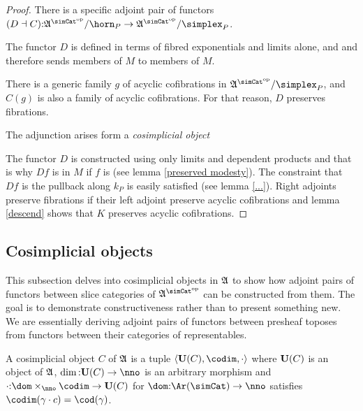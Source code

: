 \documentclass[csh.tex]{subfiles}
\begin{document}
\newcommand\dsum[1]{\Sigma_{#1}}
\begin{proof}









There is a specific adjoint pair of functors $(D\dashv C)\of\ambient\s/\horn_P\to\ambient\s/\simplex_P$.


The functor $D$ is defined in terms of fibred exponentials and limits alone, and and therefore sends members of $M$ to members of $M$. 



There is a generic family $g$ of acyclic cofibrations in $\ambient\s/\simplex_P$, and $C(g)$ is also a family of acyclic cofibrations. For that reason, $D$ preserves fibrations.






The adjunction arises form a \emph{cosimplicial object} %

The functor $D$ is constructed using only limits and dependent products and that is why $Df$ is in $M$ if $f$ is (see lemma \ref{preserved modesty}).
The constraint that $Df$ is the pullback along $k_P$ is easily satisfied (see lemma \ref{...}).
Right adjoints preserve fibrations if their left adjoint preserve acyclic cofibrations and lemma \ref{descend} shows that $K$ preserves acyclic cofibrations.

\end{proof}




\subsection{Cosimplicial objects}
This subsection delves into cosimplicial objects in $\mathfrak A$ to show how adjoint pairs of functors between slice categories of $\ambient\s$ can be constructed from them. The goal is to demonstrate constructiveness rather than to present something new. We are essentially deriving adjoint pairs of functors between presheaf toposes from functors between their categories of representables.

\begin{definition} A cosimplicial object $C$ of $\mathfrak A$ is a tuple $\tuplet{\base(C),\codim,\cdot}$ where $\mathbf{U}(C)$ is an object of $\mathfrak A$, $\dim\of\base(C)\to\nno$ is an arbitrary morphism and $\cdot\of \dom\times_{\nno}\codim \to \base (C)$ for $\dom\of \Ar(\simCat)\to\nno$
 satisfies $\codim(\gamma\cdot c) = \cod(\gamma)$.
\end{definition}
\end{document}
